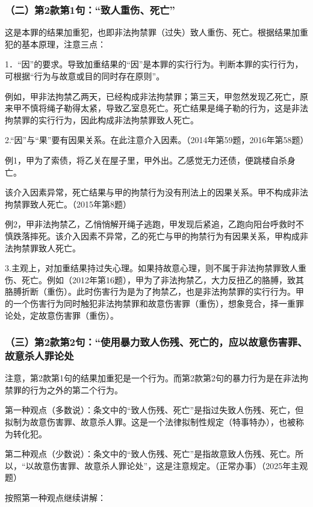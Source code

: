 \subsubsection*{（二）第2款第1句：“致人重伤、死亡”}

这是本罪的结果加重犯，也即非法拘禁罪（过失）致人重伤、死亡。根据结果加重犯的基本原理，注意三点：

1．“因”的要求。导致加重结果的“因”是本罪的实行行为。判断本罪的实行行为，可根据“行为与故意或目的同时存在原则”。

例如，甲非法拘禁乙两天，已经构成非法拘禁罪；第三天，甲忽然发现乙死亡，原来甲不慎将绳子勒得太紧，导致乙室息死亡。死亡结果是绳子勒的行为，这是非法拘禁罪的实行行为，因此构成非法拘禁罪致人死亡。

2.“因”与“果”要有因果关系。在此注意介入因素。（2014年第59题，2016年第58题）

例1，甲为了索债，将乙关在屋子里，甲外出。乙感觉无力还债，便跳楼自杀身亡。

该介入因素异常，死亡结果与甲的拘禁行为没有刑法上的因果关系。甲不构成非法拘禁罪致人死亡。（2015年第8题）

例2，甲非法拘禁乙，乙悄悄解开绳子逃跑，甲发现后紧追，乙跑向阳台呼救时不慎跌落摔死。该介入因素不异常，乙的死亡与甲的拘禁行为有因果关系，甲构成非法拘禁罪致人死亡。

3.主观上，对加重结果持过失心理。如果持故意心理，则不属于非法拘禁罪致人重伤、死亡。例如（2012年第16题），甲为了非法拘禁乙，大力反扭乙的胳膊，致其胳膊折断（重伤）。此时伤害行为是为了拘禁乙，也是非法拘禁罪的实行行为。甲的一个伤害行为同时触犯非法拘禁罪和故意伤害罪（重伤），想象竞合，择一重罪论处，定故意伤害罪（重伤）。

\subsubsection*{（三）第2款第2句：“使用暴力致人伤残、死亡的，应以故意伤害罪、故意杀人罪论处}

注意，第2款第1句的结果加重犯是一个行为。而第2款第2句的暴力行为是在非法拘禁罪的行为之外的第二个行为。

第一种观点（多数说）：条文中的“致人伤残、死亡”是指过失致人伤残、死亡，但拟制为故意伤害罪、故意杀人罪。这是一个法律拟制性规定（特事特办），也被称为转化犯。

第二种观点（少数说）：条文中的“致人伤残、死亡”是指故意致人伤残、死亡。所以，“以故意伤害罪、故意杀人罪论处”，这是注意规定。（正常办事）（2025年主观题）

按照第一种观点继续讲解：

